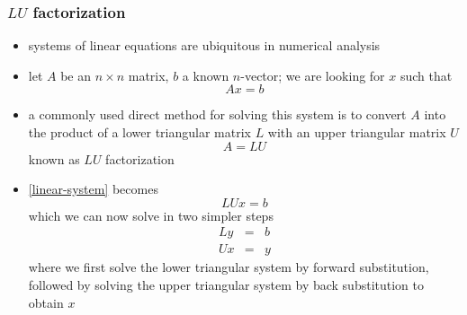 \begin{frame}[fragile]
%
  \frametitle{$LU$ factorization}
%
  \begin{itemize}
%
  \item systems of linear equations are ubiquitous in numerical analysis
  \item let $A$ be an $n \times n$ matrix, $b$ a known $n$-vector; we are looking for $x$ such
    that
    \begin{equation}
      A x = b \label{eq:linear-system}
    \end{equation}
  \item a commonly used direct method for solving this system is to convert $A$ into the
    product of a lower triangular matrix $L$ with an upper triangular matrix $U$
    \begin{equation}
      A = L U \label{eq:LU-factorization}
    \end{equation}
    known as $LU$ factorization
  \item \eqref{linear-system} becomes
    \begin{equation}
      L U x = b
    \end{equation}
    which we can now solve in two simpler steps
    \begin{eqnarray}
        L y & = & b \\
        U x & = & y
    \end{eqnarray}
    where we first solve the lower triangular system by forward substitution, followed by
    solving the upper triangular system by back substitution to obtain $x$
%
  \end{itemize}
%
\end{frame}

